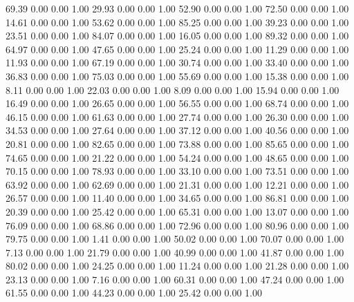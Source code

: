    69.39   0.00   0.00   1.00
   29.93   0.00   0.00   1.00
   52.90   0.00   0.00   1.00
   72.50   0.00   0.00   1.00
   14.61   0.00   0.00   1.00
   53.62   0.00   0.00   1.00
   85.25   0.00   0.00   1.00
   39.23   0.00   0.00   1.00
   23.51   0.00   0.00   1.00
   84.07   0.00   0.00   1.00
   16.05   0.00   0.00   1.00
   89.32   0.00   0.00   1.00
   64.97   0.00   0.00   1.00
   47.65   0.00   0.00   1.00
   25.24   0.00   0.00   1.00
   11.29   0.00   0.00   1.00
   11.93   0.00   0.00   1.00
   67.19   0.00   0.00   1.00
   30.74   0.00   0.00   1.00
   33.40   0.00   0.00   1.00
   36.83   0.00   0.00   1.00
   75.03   0.00   0.00   1.00
   55.69   0.00   0.00   1.00
   15.38   0.00   0.00   1.00
    8.11   0.00   0.00   1.00
   22.03   0.00   0.00   1.00
    8.09   0.00   0.00   1.00
   15.94   0.00   0.00   1.00
   16.49   0.00   0.00   1.00
   26.65   0.00   0.00   1.00
   56.55   0.00   0.00   1.00
   68.74   0.00   0.00   1.00
   46.15   0.00   0.00   1.00
   61.63   0.00   0.00   1.00
   27.74   0.00   0.00   1.00
   26.30   0.00   0.00   1.00
   34.53   0.00   0.00   1.00
   27.64   0.00   0.00   1.00
   37.12   0.00   0.00   1.00
   40.56   0.00   0.00   1.00
   20.81   0.00   0.00   1.00
   82.65   0.00   0.00   1.00
   73.88   0.00   0.00   1.00
   85.65   0.00   0.00   1.00
   74.65   0.00   0.00   1.00
   21.22   0.00   0.00   1.00
   54.24   0.00   0.00   1.00
   48.65   0.00   0.00   1.00
   70.15   0.00   0.00   1.00
   78.93   0.00   0.00   1.00
   33.10   0.00   0.00   1.00
   73.51   0.00   0.00   1.00
   63.92   0.00   0.00   1.00
   62.69   0.00   0.00   1.00
   21.31   0.00   0.00   1.00
   12.21   0.00   0.00   1.00
   26.57   0.00   0.00   1.00
   11.40   0.00   0.00   1.00
   34.65   0.00   0.00   1.00
   86.81   0.00   0.00   1.00
   20.39   0.00   0.00   1.00
   25.42   0.00   0.00   1.00
   65.31   0.00   0.00   1.00
   13.07   0.00   0.00   1.00
   76.09   0.00   0.00   1.00
   68.86   0.00   0.00   1.00
   72.96   0.00   0.00   1.00
   80.96   0.00   0.00   1.00
   79.75   0.00   0.00   1.00
    1.41   0.00   0.00   1.00
   50.02   0.00   0.00   1.00
   70.07   0.00   0.00   1.00
    7.13   0.00   0.00   1.00
   21.79   0.00   0.00   1.00
   40.99   0.00   0.00   1.00
   41.87   0.00   0.00   1.00
   80.02   0.00   0.00   1.00
   24.25   0.00   0.00   1.00
   11.24   0.00   0.00   1.00
   21.28   0.00   0.00   1.00
   23.13   0.00   0.00   1.00
    7.16   0.00   0.00   1.00
   60.31   0.00   0.00   1.00
   47.24   0.00   0.00   1.00
   61.55   0.00   0.00   1.00
   44.23   0.00   0.00   1.00
   25.42   0.00   0.00   1.00
